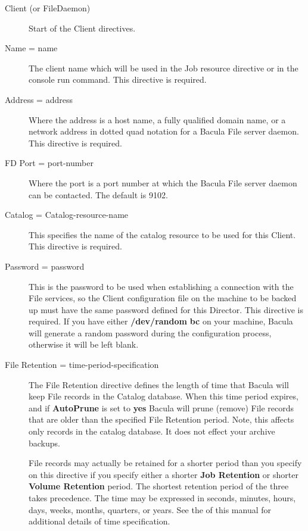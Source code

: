 \begin{description}

\item [Client (or FileDaemon)]
   Start of the Client directives.  

\item [Name = \lt{}name\gt{}]
   The client name which will be used in the  Job resource directive or in the
console run command.  This directive is required.  

\item [Address = \lt{}address\gt{}]
   Where the address is a host  name, a fully qualified domain name, or a network
address in  dotted quad notation for a Bacula File server daemon.  This
directive is required. 

\item [FD Port = \lt{}port-number\gt{}]
   Where the port is a port  number at which the Bacula File server daemon can be
contacted.  The default is 9102. 

\item [Catalog = \lt{}Catalog-resource-name\gt{}]
   This specifies the  name of the catalog resource to be used for this Client. 
This directive is required.  

\item [Password = \lt{}password\gt{}]
   This is the password to be  used when establishing a connection with the File
services, so  the Client configuration file on the machine to be backed up
must  have the same password defined for this Director. This directive is 
required.  If you have either {\bf /dev/random}  {\bf bc} on your machine,
Bacula will generate a random  password during the configuration process,
otherwise it will  be left blank. 
\label{FileRetention}

\item [File Retention = \lt{}time-period-specification\gt{}]
   The File Retention directive defines the length of time that  Bacula will keep
File records in the Catalog database.  When this time period expires, and if
{\bf AutoPrune} is set to  {\bf yes} Bacula will prune (remove) File records
that  are older than the specified File Retention period. Note, this  affects
only records in the catalog database. It does not  effect your archive
backups.  

File records  may actually be retained for a shorter period than you specify
on  this directive if you specify either a shorter {\bf Job Retention}  or
shorter {\bf Volume Retention} period. The shortest  retention period of the
three takes precedence.  The time may be expressed in seconds, minutes, 
hours, days, weeks, months, quarters, or years. See the 
 of this  manual for
additional details of time specification. 


\end{description}

